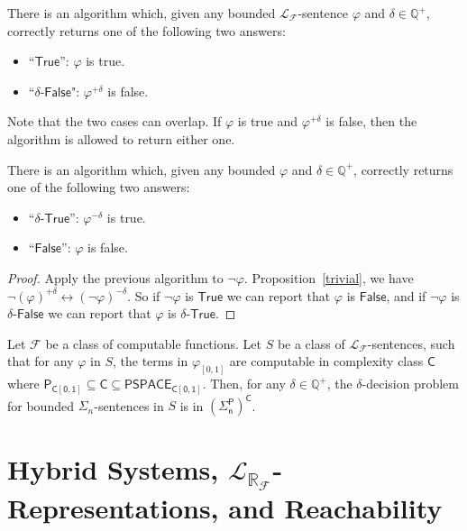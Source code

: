 \documentclass[envcountsect]{llncs}
\newcommand{\lrf}{\mathcal{L}_{\mathbb{R}_{\mathcal{F}}}}
\begin{document}
\begin{theorem}\label{main}
There is an algorithm which, given any bounded $\mathcal{L}_{\mathcal{F}}$-sentence $\varphi$ and $\delta\in \mathbb{Q}^+$, correctly returns one of the following two answers:
\begin{itemize}
\item ``$\mathsf{True}$'': $\varphi$ is true. 
\item ``$\delta$-$\mathsf{False}$": $\varphi^{+\delta}$ is false. 
\end{itemize}
\end{theorem}

Note that the two cases can overlap. If $\varphi$ is true and $\varphi^{+\delta}$ is false, then the algorithm is allowed to return either one. 

\begin{corollary}
There is an algorithm which, given any bounded $\varphi$ and $\delta\in \mathbb{Q}^+$, correctly returns one of the following two answers:
\begin{itemize}
\item ``$\delta$-$\mathsf{True}$'': $\varphi^{-\delta}$ is true. 
\item ``$\mathsf{False}$'': $\varphi$ is false. 
\end{itemize} 
\end{corollary}

\begin{proof}
Apply the previous algorithm to $\neg\varphi$. Proposition~\ref{trivial}, we have $\neg(\varphi)^{+\delta}\leftrightarrow (\neg\varphi)^{-\delta}$. So if $\neg\varphi$ is $\mathsf{True}$ we can report that $\varphi$ is $\mathsf{False}$, and if $\neg\varphi$ is $\delta$-$\mathsf{False}$ we can report that $\varphi$ is $\delta$-$\mathsf{True}$.
\end{proof}

\begin{theorem}\label{compmain}
Let $\mathcal{F}$ be a class of computable functions. Let $S$ be a class of $\mathcal{L}_{\mathcal{F}}$-sentences, such that for any $\varphi$ in $S$, the terms in $\varphi_{[0,1]}$ are computable in complexity class $\mathsf{C}$ where $\mathsf{P_{C[0,1]}\subseteq \mathsf{C}\subseteq \mathsf{PSPACE_{C[0,1]}}}$. Then, for any $\delta\in \mathbb{Q}^+$, the $\delta$-decision problem for bounded $\Sigma_n$-sentences in $S$ is in $\mathsf{(\Sigma_n^P)^C}$.
\end{theorem}


\section{Hybrid Systems, $\lrf$-Representations, and Reachability}
\end{document}
